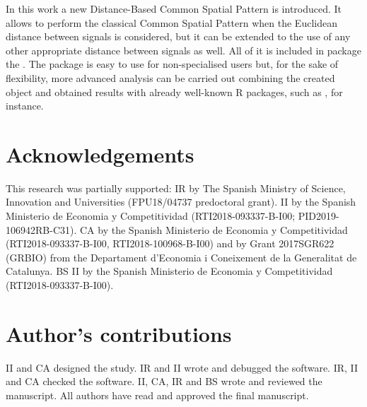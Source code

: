 In this work a new Distance-Based Common Spatial Pattern is introduced. It allows to perform the classical Common Spatial Pattern when the Euclidean distance between signals is considered, but it can be extended to the use of any other appropriate distance between signals as well. All of it is included in package the . The package is easy to use for non-specialised users but, for the sake of flexibility, more advanced analysis can be carried out combining the created object and obtained results with already well-known R packages, such as , for instance.




\section*{Acknowledgements}
This research was partially supported: 
IR by The Spanish Ministry of Science, Innovation and Universities (FPU18/04737 predoctoral grant). II by the Spanish Ministerio de Economia y Competitividad (RTI2018-093337-B-I00; PID2019-106942RB-C31). CA by the Spanish Ministerio de Economia y Competitividad (RTI2018-093337-B-I00, RTI2018-100968-B-I00) and by Grant 2017SGR622 (GRBIO) from the Departament d'Economia i Coneixement de la Generalitat de Catalunya. BS  II by the Spanish Ministerio de Economia y Competitividad (RTI2018-093337-B-I00).

\section*{Author's contributions}
II and CA designed the study. IR and II wrote and debugged  the software. IR, II and CA  checked the software. II, CA, IR and BS wrote and reviewed the manuscript. All authors have read and approved the final manuscript.
 



\address{Itsaso Rodr\'{i}guez\\
  Department
of Computation Science and Artificial Intelligence,
University of the Basque Country UPV/EHU\\
  Manuel Lardizabal 1, Donostia\\
  Spain\\
  }

\address{Itziar Irigoien\\
  Department
of Computation Science and Artificial Intelligence,
University of the Basque Country UPV/EHU\\
  Manuel Lardizabal 1, Donostia\\
  Spain\\
   }


